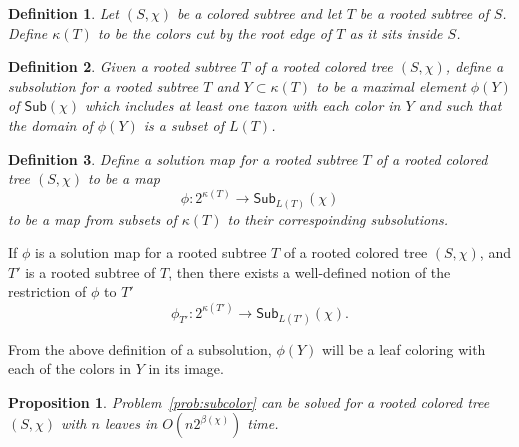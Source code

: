 \documentclass{amsart}
\newcommand{\col}{\chi}
\newcommand{\subcolS}{\mathsf{Sub}}
\newcommand{\cut}{\kappa}
\newcommand{\bad}{\beta}
\newtheorem{prop}{Proposition}
\newtheorem{defn}{Definition}
\begin{document}
\begin{defn}
  Let $(S, \col)$ be a colored subtree and let $T$ be a rooted subtree of $S$.
  Define $\cut(T)$ to be the colors cut by the root edge of $T$ as it sits inside $S$.
\end{defn}

\begin{defn}
  Given a rooted subtree $T$ of a rooted colored tree $(S, \col)$, define a subsolution for a rooted subtree $T$ and $Y \subset \cut(T)$ to be a maximal element $\phi(Y)$ of $\subcolS(\col)$ which includes at least one taxon with each color in $Y$ and such that the domain of $\phi(Y)$ is a subset of $L(T)$.
\end{defn}

\begin{defn}
  Define a solution map for a rooted subtree $T$ of a rooted colored tree $(S, \col)$ to be a map
  \[
  \phi: 2^{\cut(T)} \rightarrow \subcolS_{L(T)}(\col)
  \]
  to be a map from subsets of $\cut(T)$ to their correspoinding subsolutions.
\end{defn}

If $\phi$ is a solution map for a rooted subtree $T$ of a rooted colored tree $(S, \col)$, and $T'$ is a rooted subtree of $T$, then there exists a well-defined notion of the restriction of $\phi$ to $T'$
\[
  \phi_{T'}: 2^{\cut(T')} \rightarrow \subcolS_{L(T')}(\col).
\]


From the above definition of a subsolution, $\phi(Y)$ will be a leaf coloring with each of the colors in $Y$ in its image.

\begin{prop}
Problem~\ref{prob:subcolor} can be solved for a rooted colored tree $(S, \col)$ with $n$ leaves in $O(n 2^{\bad(\col)})$ time.
\end{prop}
\end{document}

